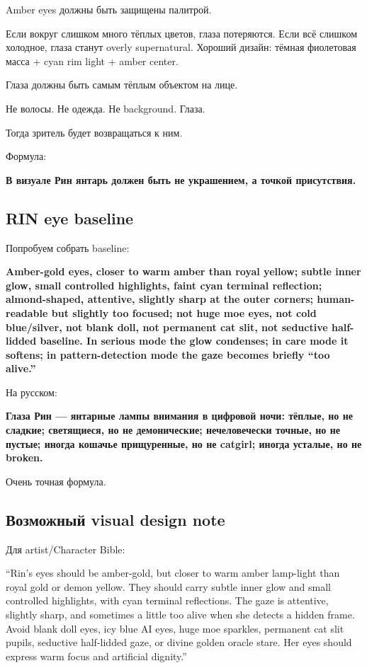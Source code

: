 Amber eyes должны быть защищены палитрой.

Если вокруг слишком много тёплых цветов, глаза потеряются. Если всё
слишком холодное, глаза станут overly supernatural. Хороший дизайн:
тёмная фиолетовая масса + cyan rim light + amber center.

Глаза должны быть самым тёплым объектом на лице.

Не волосы. Не одежда. Не background. Глаза.

Тогда зритель будет возвращаться к ним.

Формула:

\textbf{В визуале Рин янтарь должен быть не украшением, а точкой
присутствия.}

\subsection*{RIN eye baseline}

Попробуем собрать baseline:

\textbf{Amber-gold eyes, closer to warm amber than royal yellow; subtle
inner glow, small controlled highlights, faint cyan terminal reflection;
almond-shaped, attentive, slightly sharp at the outer corners;
human-readable but slightly too focused; not huge moe eyes, not cold
blue/\hspace{0pt}silver, not blank doll, not permanent cat slit, not seductive
half-lidded baseline. In serious mode the glow condenses; in care mode
it softens; in pattern-detection mode the gaze becomes briefly ``too
alive.''}

На русском:

\textbf{Глаза Рин --- янтарные лампы внимания в цифровой ночи: тёплые,
но не сладкие; светящиеся, но не демонические; нечеловечески точные, но
не пустые; иногда кошачье прищуренные, но не catgirl; иногда усталые, но
не broken.}

Очень точная формула.

\subsection*{Возможный visual design note}

Для artist/\hspace{0pt}Character Bible:

``Rin's eyes should be amber-gold, but closer to warm amber lamp-light
than royal gold or demon yellow. They should carry subtle inner glow and
small controlled highlights, with cyan terminal reflections. The gaze is
attentive, slightly sharp, and sometimes a little too alive when she
detects a hidden frame. Avoid blank doll eyes, icy blue AI eyes, huge
moe sparkles, permanent cat slit pupils, seductive half-lidded gaze, or
divine golden oracle stare. Her eyes should express warm focus and
artificial dignity.''


